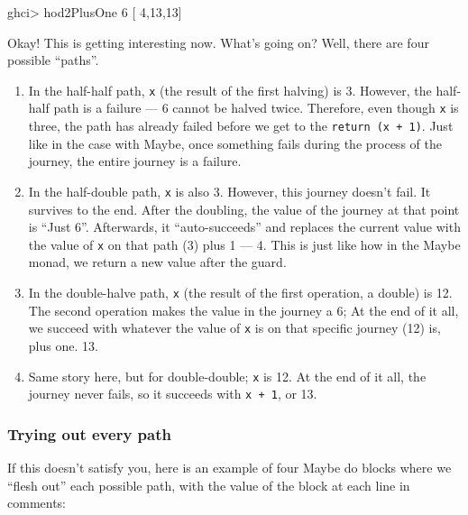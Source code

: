\documentclass[]{article}
\newenvironment{Shaded}{}{}
\newcommand{\DecValTok}[1]{\textcolor[rgb]{0.25,0.63,0.44}{{#1}}}
\newcommand{\FunctionTok}[1]{\textcolor[rgb]{0.02,0.16,0.49}{{#1}}}
\newcommand{\NormalTok}[1]{{#1}}
\begin{document}
\begin{Shaded}
\begin{Highlighting}[]
\NormalTok{ghci}\FunctionTok{>} \NormalTok{hod2PlusOne }\DecValTok{6}
\NormalTok{[   }\DecValTok{4}\NormalTok{,}\DecValTok{13}\NormalTok{,}\DecValTok{13}\NormalTok{]}
\end{Highlighting}
\end{Shaded}

Okay! This is getting interesting now. What's going on? Well, there are
four possible ``paths''.

\begin{enumerate}
\def\labelenumi{\arabic{enumi}.}
\tightlist
\item
  In the half-half path, \texttt{x} (the result of the first halving) is
  3. However, the half-half path is a failure --- 6 cannot be halved
  twice. Therefore, even though \texttt{x} is three, the path has
  already failed before we get to the \texttt{return\ (x\ +\ 1)}. Just
  like in the case with Maybe, once something fails during the process
  of the journey, the entire journey is a failure.
\item
  In the half-double path, \texttt{x} is also 3. However, this journey
  doesn't fail. It survives to the end. After the doubling, the value of
  the journey at that point is ``Just 6''. Afterwards, it
  ``auto-succeeds'' and replaces the current value with the value of
  \texttt{x} on that path (3) plus 1 --- 4. This is just like how in the
  Maybe monad, we return a new value after the guard.
\item
  In the double-halve path, \texttt{x} (the result of the first
  operation, a double) is 12. The second operation makes the value in
  the journey a 6; At the end of it all, we succeed with whatever the
  value of \texttt{x} is on that specific journey (12) is, plus one. 13.
\item
  Same story here, but for double-double; \texttt{x} is 12. At the end
  of it all, the journey never fails, so it succeeds with
  \texttt{x\ +\ 1}, or 13.
\end{enumerate}

\subsubsection{Trying out every path}\label{trying-out-every-path}

If this doesn't satisfy you, here is an example of four Maybe do blocks
where we ``flesh out'' each possible path, with the value of the block
at each line in comments:
\end{document}
